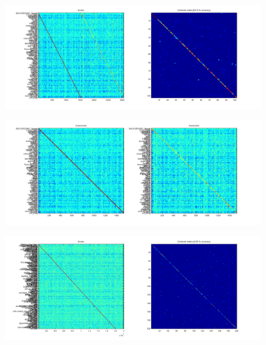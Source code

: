 \documentclass[10pt,two column,letter paper]{article}
\begin{document}
\begin{figure}[t]
\begin{center}
\includegraphics[width=0.9\linewidth]{caltech101_baseline.png}
\end{center}
   \caption{}
\label{fig:calt_A}
\end{figure}

\begin{figure}[t]
\begin{center}
\includegraphics[width=0.9\linewidth]{caltech101-2_baseline.png}
\end{center}
   \caption{}
\label{fig:calt_B}
\end{figure}

\begin{figure}[t]
\begin{center}
\includegraphics[width=0.9\linewidth]{m1_imagenet_tiny.png}
\end{center}
   \caption{}
\label{fig:m1_imagenet_tiny}
\end{figure}
\end{document}
